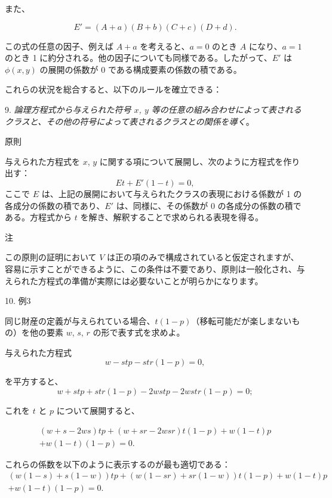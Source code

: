 \documentclass[a4paper,11pt,openany]{ltjsbook}
\begin{document}
また、

\[
E' = (A+a)(B+b)(C+c)(D+d).
\]

この式の任意の因子、例えば $A + a$ を考えると、$a = 0$ のとき $A$ になり、$a = 1$ のとき 1 に約分される。他の因子についても同様である。したがって、$E'$ は $\phi(x, y)$ の展開の係数が 0 である構成要素の係数の積である。

これらの状況を総合すると、以下のルールを確立できる：

9. \textit{論理方程式から与えられた符号 $x$, $y$ 等の任意の組み合わせによって表されるクラスと、その他の符号によって表されるクラスとの関係を導く}。

原則

与えられた方程式を $x$, $y$ に関する項について展開し、次のように方程式を作り出す：
$$Et + E'(1-t) = 0,$$
ここで $E$ は、上記の展開において与えられたクラスの表現における係数が 1 の各成分の係数の積であり、$E'$ は、同様に、その係数が 0 の各成分の係数の積である。方程式から $t$ を解き、解釈することで求められる表現を得る。

注

この原則の証明において $V$ は正の項のみで構成されていると仮定されますが、容易に示すことができるように、この条件は不要であり、原則は一般化され、与えられた方程式の準備が実際には必要ないことが明らかになります。

10. 例3

同じ財産の定義が与えられている場合、$t(1 - p)$（移転可能だが楽しまないもの）を他の要素 $w$, $s$, $r$ の形で表す式を求めよ。

与えられた方程式
$$w - stp - str (1 - p) = 0,$$

を平方すると、
$$w + stp + str (1 - p) - 2wstp - 2wstr (1 - p) = 0;$$

これを $t$ と $p$ について展開すると、

\begin{eqnarray*}
(w + s - 2ws) tp + (w + sr - 2wsr) t (1 - p) + w (1 -t)p\\
+ w(1-t)(1-p) = 0.
\end{eqnarray*}

これらの係数を以下のように表示するのが最も適切である：
\begin{eqnarray*}
(w(1-s)+s(1-w))tp+(w(1-sr)+sr(1-w))t(1-p)+w(1-t)p\\
+w(1-t)(1-p)=0.
\end{eqnarray*}
\end{document}
